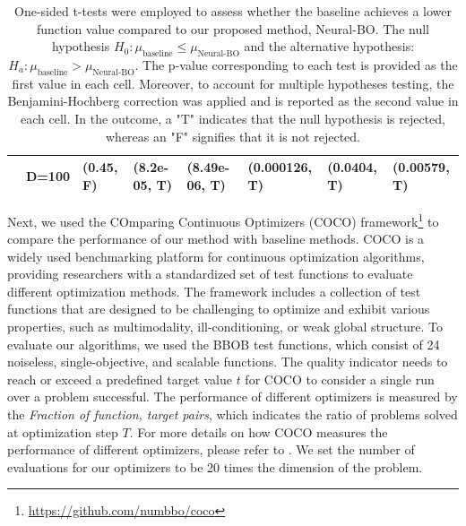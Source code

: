 \begin{table}[ht]
{\begin{tabular}{|cc|l|l|l|l|l|l|}
\multicolumn{1}{|c|}{}                                                                                  & D=100 & (0.45, F)                                                                             & (8.2e-05, T)                        & (8.49e-06, T)                      & (0.000126, T)                      & (0.0404, T)                        & (0.00579, T)                     \\ \hline
\end{tabular}
}
\caption{One-sided t-tests were employed to assess whether the baseline achieves a lower function value compared to our proposed method, Neural-BO.  The null hypothesis $H_0: \mu_\text{baseline} \le \mu_{\text{Neural-BO}}$ and the alternative hypothesis:  $H_a: \mu_\text{baseline} > \mu_{\text{Neural-BO}}$. The p-value corresponding to each test is provided as the first value in each cell. Moreover, to account for multiple hypotheses testing, the Benjamini-Hochberg correction was applied and is reported as the second value in each cell. In the outcome, a "T" indicates that the null hypothesis is rejected, whereas an "F" signifies that it is not rejected.}
\label{tab:neural-bo_t-test}
\end{table}



Next, we used the COmparing Continuous Optimizers (COCO) framework\footnote{ \url{https://github.com/numbbo/coco}} to compare the performance of our method with baseline methods. COCO is a widely used benchmarking platform for continuous optimization algorithms, providing researchers with a standardized set of test functions to evaluate different optimization methods. The framework includes a collection of test functions that are designed to be challenging to optimize and exhibit various properties, such as multimodality, ill-conditioning, or weak global structure. To evaluate our algorithms, we used the BBOB test functions, which consist of 24 noiseless, single-objective, and scalable functions. The quality indicator needs to reach or exceed a predefined target value  $t$  for COCO to consider a single run over a problem successful. The performance of different optimizers is measured by the \textit{Fraction of function, target pairs}, which indicates the ratio of problems solved at optimization step $T$. For more details on how COCO measures the performance of different optimizers, please refer to \citet{hansen2021coco}. We set the number of evaluations for our optimizers to be 20 times the dimension of the problem. 

